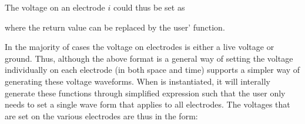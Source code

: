 \documentclass[letterpaper,10pt,english]{sphinxmanual}
\begin{document}
\sphinxAtStartPar
The voltage on an electrode \(i\) could thus be set as

\begin{sphinxVerbatim}[commandchars=\\\{\},formatcom=\scriptsize]
 

   \PYG{p}{[}\PYG{p}{]}       
     

 
\end{sphinxVerbatim}

\sphinxAtStartPar
where the return value can be replaced by the user’ function.

\sphinxAtStartPar
In the majority of cases the voltage on electrodes is either a live voltage or ground.
Thus, although the above format is a general way of setting the voltage individually on each electrode (in both space and time)  supports a simpler way of generating these voltage waveforms.
When  is instantiated, it will interally generate these functions through simplified expression such that the user only needs to set a single wave form that applies to all electrodes.
The voltages that are set on the various electrodes are thus in the form:

\begin{sphinxVerbatim}[commandchars=\\\{\},formatcom=\scriptsize]
 
 
   

   \PYG{p}{[}\PYG{p}{]}       
      

 
\end{sphinxVerbatim}
\end{document}
